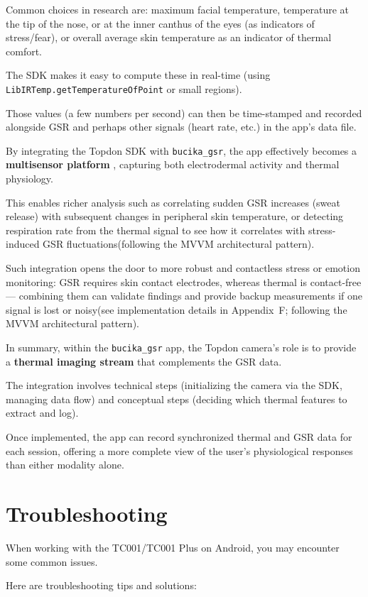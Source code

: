 {Common choices in research are: maximum facial temperature, temperature at the
tip of the nose, or at the inner canthus of the eyes (as indicators of
stress/fear), or overall average skin temperature as an indicator of thermal
comfort.

The SDK makes it easy to compute these in real-time (using
\texttt{LibIRTemp.getTemperatureOfPoint} or small regions).

Those values (a few numbers per second) can then be time-stamped and recorded
alongside GSR and perhaps other signals (heart rate, etc.) in the app's data
file.

By integrating the Topdon SDK with \texttt{bucika_gsr}, the app effectively becomes a \textbf{multisensor platform}
, capturing both electrodermal activity and thermal physiology.

This enables richer analysis such as correlating sudden GSR increases (sweat
release) with subsequent changes in peripheral skin temperature, or detecting
respiration rate from the thermal signal to see how it correlates with
stress-induced GSR fluctuations(following the MVVM architectural pattern).

Such integration opens the door to more robust and contactless stress or emotion
monitoring: GSR requires skin contact electrodes, whereas thermal is
contact-free --- combining them can validate findings and provide backup
measurements if one signal is lost or noisy(see implementation details in
Appendix~F; following the MVVM architectural pattern).

In summary, within the \texttt{bucika_gsr} app, the Topdon camera's role is to provide a \textbf{thermal imaging stream}
 that complements the GSR data.

The integration involves technical steps (initializing the camera via the SDK,
managing data flow) and conceptual steps (deciding which thermal features to
extract and log).

Once implemented, the app can record synchronized thermal and GSR data for each
session, offering a more complete view of the user's physiological responses
than either modality alone.

\section{Troubleshooting}

When working with the TC001/TC001 Plus on Android, you may encounter some common
issues.

Here are troubleshooting tips and solutions: \begin{itemize}


\end{itemize}}
